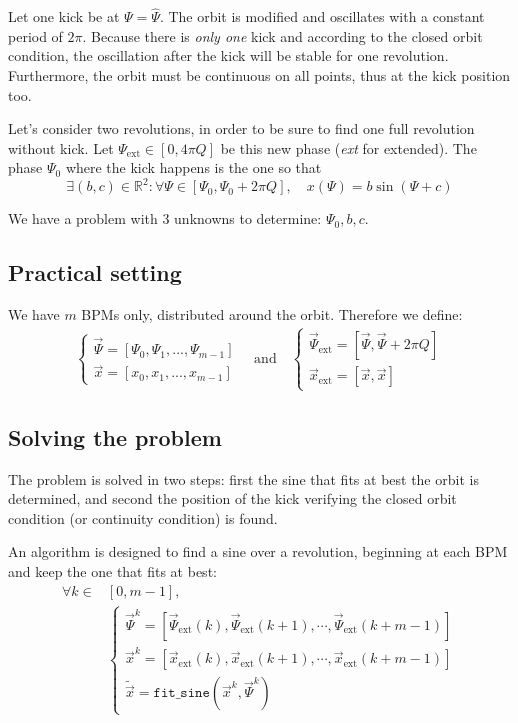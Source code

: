 Let one kick be at $\Psi = \hat{\Psi}$. The orbit is modified and oscillates with a constant period of $2 \pi$. Because there is {\em only one} kick and according to the closed orbit condition, the oscillation after the kick will be stable for one revolution. Furthermore, the orbit must be continuous on all points, thus at the kick position too.

Let's consider two revolutions, in order to be sure to find one full revolution without kick. Let $\Psi_\mathrm{ext} \in [0, 4 \pi Q]$ be this new phase (\textit{ext} for extended). The phase $\Psi_0$ where the kick happens is the one so that 
\begin{equation}
\exists (b, c) \in \mathbb{R}^2:
\forall \Psi \in [\Psi_0, \Psi_0 + 2 \pi Q], \quad
x(\Psi) = b \sin(\Psi + c)
\end{equation}

We have a problem with 3 unknowns to determine: $\Psi_0, b, c$. 

\subsection{Practical setting}

We have $m$ BPMs only, distributed around the orbit.
Therefore we define:
\begin{align}
\begin{cases}
\vec{\Psi} = [\Psi_0, \Psi_1, ..., \Psi_{m-1}] \\
\vec{x} = [x_0, x_1, ..., x_{m-1}]
\end{cases} \quad \mathrm{and} \quad
\begin{cases}
\vec{\Psi}_\mathrm{ext} = [\vec{\Psi}, \vec{\Psi}+2\pi Q ]\\
\vec{x}_\mathrm{ext} = [\vec{x}, \vec{x}]
\end{cases}
\end{align}

\subsection{Solving the problem}

The problem is solved in two steps: first the sine that fits at best the orbit is determined, and second the position of the kick verifying the closed orbit condition (or continuity condition) is found.

An algorithm is designed to find a sine over a revolution, beginning at each BPM and keep the one that fits at best:
\begin{align}
\forall k \in &[0, m-1], \nonumber \\
&\begin{cases}
\vec{\Psi}^k = [\vec{\Psi}_\mathrm{ext}(k), \vec{\Psi}_\mathrm{ext}(k+1), \cdots,  \vec{\Psi}_\mathrm{ext}(k+m-1)]\\
\vec{x}^k = [\vec{x}_\mathrm{ext}(k), \vec{x}_\mathrm{ext}(k+1), \cdots,  \vec{x}_\mathrm{ext}(k+m-1)]\\
\tilde{\vec{x}} = \mathtt{fit\_sine}(\vec{x}^k, \vec{\Psi}^k)
\end{cases}
\end{align}

